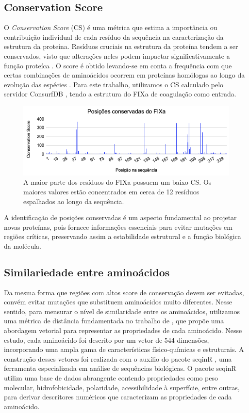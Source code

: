 \subsection{Conservation Score}
\label{subsection:CS}
O \textit{Conservation Score} (CS) é uma métrica que estima a importância ou 
contribuição individual de cada resíduo da sequência na caracterização da estrutura da proteína.
Resíduos cruciais na estrutura da proteína tendem a ser conservados,
visto que alterações neles podem impactar significativamente a função proteíca \cite{CS}. 
O score é obtido levando-se em conta a frequência com que certas combinações de aminoácidos 
ocorrem em proteínas homólogas ao longo da evolução das espécies \cite{Eddy}. 
Para este trabalho, utilizamos o CS calculado pelo servidor ConsurfDB \cite{ConsurfDB},
tendo a estrutura do FIXa de coagulação como entrada. 

\begin{figure}[H]
    \centering
    \includegraphics[width=.8\textwidth]{figuras/ConservationScore.png}
    \caption[FIXa Conservation Score]{A maior parte dos resíduos do FIXa possuem um baixo CS. Os maiores valores estão concentrados em cerca de 12 resíduos 
    espalhados ao longo da sequência.}
  \end{figure}

A identificação de posições conservadas é um aspecto fundamental ao projetar novas proteínas,
pois fornece informações essenciais para evitar mutações em regiões críticas,
preservando assim a estabilidade estrutural e a função biológica da molécula.

\subsection{Similariedade entre aminoácidos}
\label{subsection:AminoDist}
Da mesma forma que regiões com altos score de conservação devem ser evitadas, 
convém evitar mutações que substituem aminoácidos muito diferentes.
Nesse sentido, para mensurar o nível de similaridade entre os aminoácidos,
utilizamos uma métrica de distância fundamentada no trabalho de \cite{aminodist}, 
que propõe uma abordagem vetorial para representar as propriedades de cada aminoácido.
Nesse estudo, cada aminoácido foi descrito por um vetor de 544 dimensões, 
incorporando uma ampla gama de características físico-químicas e estruturais. 
A construção desses vetores foi realizada com o auxílio do pacote seqinR \cite{seqinR}, 
uma ferramenta especializada em análise de sequências biológicas.
O pacote seqinR utiliza uma base de dados abrangente contendo propriedades como peso molecular,
hidrofobicidade, polaridade, acessibilidade à superfície, entre outras,
para derivar descritores numéricos que caracterizam as propriedades de cada aminoácido.

